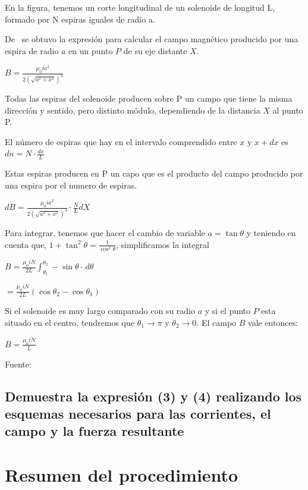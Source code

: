 \documentclass[letterpaper, 12pt]{article}
\begin{document}
\begin{multicols}{2}
	En la figura, tenemos un corte longitudinal de un solenoide de longitud L,
	formado por N espiras iguales de radio a.

	De~\cite{CampoElectricoPorEspira} se obtuvo la expresión para calcular el campo
	magnético producido por una espira de radio $a$ en un punto $P$ de su eje
	distante $X$.

		{\large $B = \displaystyle\frac{\mu_0 i a^2}{2 \left(\sqrt{a^2 + x^2}\right)^3}$}

	Todas las espiras del solenoide producen sobre P un campo que tiene la misma
	dirección y sentido, pero distinto módulo, dependiendo de la distancia $X$ al
	punto P.

	El número de espiras que hay en el intervalo comprendido entre
	$x$ y $x+dx$ es $dn = N \cdot \frac{dx}{L}$

	Estas espiras producen en P un capo que es el producto del campo producido por
	una espira por el numero de espiras.

		{\large $dB = \frac{\mu_0 i a^2}{2 \left(\sqrt{a^2 + x^2}\right)^3} \cdot \frac{N}{L} dX$}

	Para integrar, tenemos que hacer el cambio de variable $a = \tan\theta$ y
	teniendo en cuenta que, {\large $1 + \tan^{2}\theta = \frac{1}{\cos^{2}\theta}$},
	simplificamos la integral

		{\large $B = \frac{\mu_0 i N}{2L} \int_{\theta_1}^{\theta_2} -\sin\theta \cdot \,d\theta$}

		{\large $ = \frac{\mu_0 i N}{2L} \left(\cos\theta_2 - \cos\theta_1\right)$}

	Si el solenoide es muy largo comparado con su radio $a$ y si el punto $P$ esta
	situado en el centro, tendremos que $\theta_1 \rightarrow \pi$ y
	$\theta_2 \rightarrow 0$. El campo $B$ vale entonces:

	{\large $B = \frac{\mu_0 i N}{L}$}

	Fuente:~\cite{CampoElectricoSolenoide}

	\subsection*{Demuestra la expresión (3) y (4) realizando los esquemas necesarios para las corrientes, el
		campo y la fuerza resultante}

	\section{Resumen del procedimiento}


\end{multicols}
\end{document}
